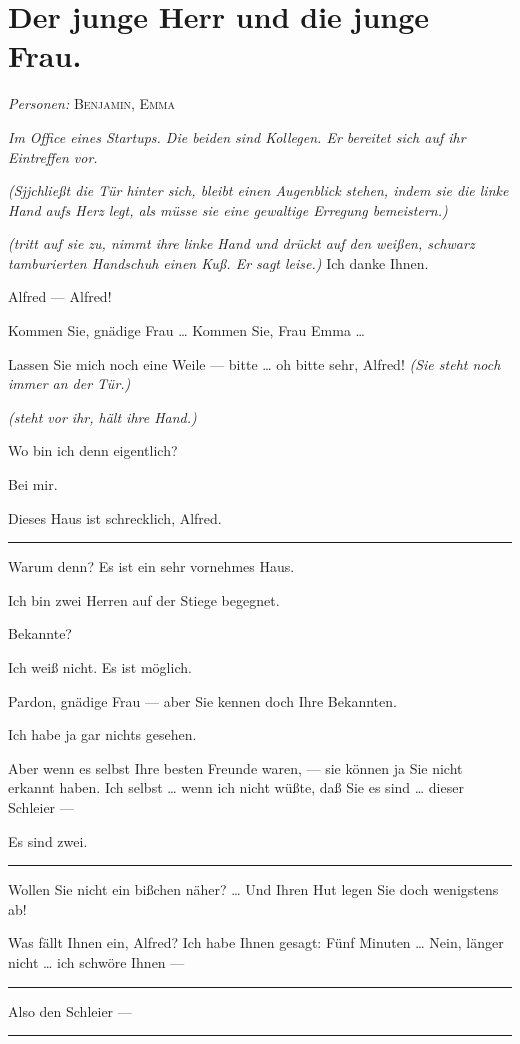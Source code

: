 \documentclass[
	final,
	a4paper,
	ngerman,
	mpinclude = true, %
	twoside = true,
	open = right,
	cleardoublepage = plain,
	DIV = 13,
	BCOR = 1cm,
	titlepage = firstiscover,
	]{scrbook}
\newcommand{\scene}{\section}
\newcommand{\direction}[1]{\textit{(#1)}}
\newcommand{\setting}[1]{\vspace{-0.5\baselineskip}\centering\textit{#1}}
\newenvironment{deletion}{%
		\vspace{0.25\baselineskip}
		\hrule
		\vspace{0.25\baselineskip}
		\color{darkgray}
	}{
		\color{black}
		\vspace{0.25\baselineskip}
		\hrule 
		\vspace{0.25\baselineskip}
	}
\newcommand{\characterlist}[1]{{\begin{center}\textit{Personen:} #1\end{center}}}
\newcommand{\thecharacter}[1]{\textup{\textsc{#1}}\xspace}
\newcommand{\theherr}{\thecharacter{Benjamin}}
\newcommand{\thefrau}{\thecharacter{Emma}}
\newcommand{\character}[1]{\item[#1:]}
\newcommand{\herr}{\character{\theherr}}
\newcommand{\frau}{\character{\thefrau}}
\begin{document}
\scene{Der junge Herr und die junge Frau.}
\characterlist{\theherr, \thefrau}
\setting{Im Office eines Startups. Die beiden sind Kollegen. Er bereitet sich auf ihr Eintreffen vor.}
\begin{play}

	\frau
	\direction{Sjjchließt die Tür hinter sich, bleibt einen Augenblick stehen, indem sie die linke Hand aufs Herz legt, als müsse sie eine gewaltige Erregung bemeistern.}

	\herr
	\direction{tritt auf sie zu, nimmt ihre linke Hand und drückt auf den weißen, schwarz tamburierten Handschuh einen Kuß. Er sagt leise.} Ich danke Ihnen.

	\frau
	Alfred --- Alfred!

	\herr
	Kommen Sie, gnädige Frau \ldots{} Kommen Sie, Frau Emma \ldots{}

	\frau
	Lassen Sie mich noch eine Weile --- bitte \ldots{} oh bitte sehr, Alfred! \direction{Sie steht noch immer an der Tür.}

	\herr
	\direction{steht vor ihr, hält ihre Hand.}

	\frau
	Wo bin ich denn eigentlich?

	\herr
	Bei mir.

	\frau
	Dieses Haus ist schrecklich, Alfred.

	\begin{deletion}
	\herr
	Warum denn? Es ist ein sehr vornehmes Haus.

	\frau
	Ich bin zwei Herren auf der Stiege begegnet.

	\herr
	Bekannte?

	\frau
	Ich weiß nicht. Es ist möglich.

	\herr
	Pardon, gnädige Frau --- aber Sie kennen doch Ihre Bekannten.

	\frau
	Ich habe ja gar nichts gesehen.

	\herr
	Aber wenn es selbst Ihre besten Freunde waren, --- sie können ja Sie nicht erkannt haben. Ich selbst \ldots{} wenn ich nicht wüßte, daß Sie es sind \ldots{} dieser Schleier ---

	\frau
	Es sind zwei.
	\end{deletion}

	\herr
	Wollen Sie nicht ein bißchen näher? \ldots{} Und Ihren Hut legen Sie doch wenigstens ab!

	\frau
	Was fällt Ihnen ein, Alfred? Ich habe Ihnen gesagt: Fünf Minuten \ldots{} Nein, länger nicht \ldots{} ich schwöre Ihnen ---

	\begin{deletion}
	\herr
	Also den Schleier ---


\end{deletion}
\end{play}
\end{document}
